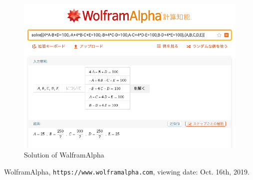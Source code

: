 \documentclass[a4paper,11pt]{article}
\begin{document}
\begin{figure}[H]
	\centering
	\includegraphics[width=15cm]{wolf.png}
	\caption{Solution of WalframAlpha~\cite{wolf}} 
\end{figure}

\begin{thebibliography}{99}
	WolframAlpha, \texttt{https://www.wolframalpha.com}, viewing date: Oct. 16th, 2019.
\end{thebibliography}


%
\end{document}
